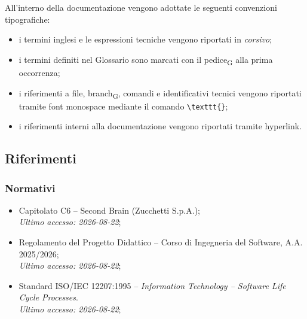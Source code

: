 All'interno della documentazione vengono adottate le seguenti convenzioni tipografiche:

\begin{itemize}
    \item i termini inglesi e le espressioni tecniche vengono riportati in \textit{corsivo};
    \item i termini definiti nel Glossario sono marcati con il pedice\textsubscript{G} alla prima occorrenza;
    \item i riferimenti a file, branch\textsubscript{G}, comandi e identificativi tecnici vengono riportati tramite font monospace mediante il comando \texttt{\textbackslash texttt\{\}};
    \item i riferimenti interni alla documentazione vengono riportati tramite hyperlink.
\end{itemize}


\subsection{Riferimenti}

\subsubsection{Normativi}

\begin{itemize}

    \item
    {Capitolato C6 -- Second Brain (Zucchetti S.p.A.)}; \\
    \textit{Ultimo accesso: 2026-08-22};

    \item
    {Regolamento del Progetto Didattico -- Corso di Ingegneria del Software, A.A. 2025/2026}; \\
    \textit{Ultimo accesso: 2026-08-22};

    \item
    {Standard ISO/IEC 12207:1995} --
    \textit{Information Technology -- Software Life Cycle Processes}. \\
    \textit{Ultimo accesso: 2026-08-22};

\end{itemize}

